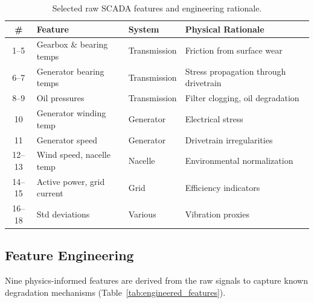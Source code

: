 \documentclass[preprint,12pt]{elsarticle}
\begin{document}
\begin{table}[H]
\centering
\caption{Selected raw SCADA features and engineering rationale.}
\label{tab:raw_features}
\begin{tabular}{clll}
\toprule
\# & Feature & System & Physical Rationale \\
\midrule
1--5 & Gearbox \& bearing temps & Transmission & Friction from surface wear \\
6--7 & Generator bearing temps & Transmission & Stress propagation through drivetrain \\
8--9 & Oil pressures & Transmission & Filter clogging, oil degradation \\
10 & Generator winding temp & Generator & Electrical stress \\
11 & Generator speed & Generator & Drivetrain irregularities \\
12--13 & Wind speed, nacelle temp & Nacelle & Environmental normalization \\
14--15 & Active power, grid current & Grid & Efficiency indicators \\
16--18 & Std deviations & Various & Vibration proxies \\
\bottomrule
\end{tabular}
\end{table}

\subsection{Feature Engineering}

Nine physics-informed features are derived from the raw signals to capture known degradation mechanisms (Table~\ref{tab:engineered_features}).
\end{document}
